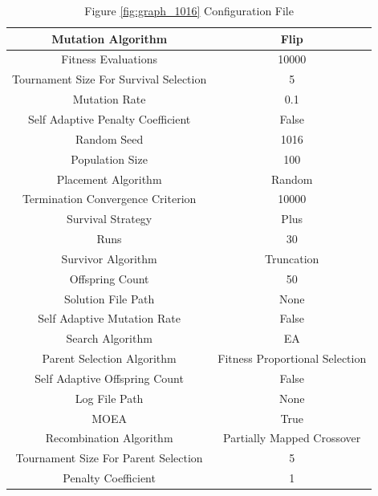 \documentclass{standalone}
\begin{document}
\begin{table}[!htb]
	\centering
	\caption{Figure \ref{fig:graph_1016} Configuration File}
	\label{tab:graph_1016}
	\begin{tabular}{| c | c |}
		\hline
		Mutation Algorithm		& Flip		 \\
		\hline
		Fitness Evaluations		& 10000		 \\
		\hline
		Tournament Size For Survival Selection		& 5		 \\
		\hline
		Mutation Rate		& 0.1		 \\
		\hline
		Self Adaptive Penalty Coefficient		& False		 \\
		\hline
		Random Seed		& 1016		 \\
		\hline
		Population Size		& 100		 \\
		\hline
		Placement Algorithm		& Random		 \\
		\hline
		Termination Convergence Criterion		& 10000		 \\
		\hline
		Survival Strategy		& Plus		 \\
		\hline
		Runs		& 30		 \\
		\hline
		Survivor Algorithm		& Truncation		 \\
		\hline
		Offspring Count		& 50		 \\
		\hline
		Solution File Path		& None		 \\
		\hline
		Self Adaptive Mutation Rate		& False		 \\
		\hline
		Search Algorithm		& EA		 \\
		\hline
		Parent Selection Algorithm		& Fitness Proportional Selection		 \\
		\hline
		Self Adaptive Offspring Count		& False		 \\
		\hline
		Log File Path		& None		 \\
		\hline
		MOEA		& True		 \\
		\hline
		Recombination Algorithm		& Partially Mapped Crossover		 \\
		\hline
		Tournament Size For Parent Selection		& 5		 \\
		\hline
		Penalty Coefficient		& 1		 \\
		\hline
	\end{tabular}
\end{table}
\end{document}
